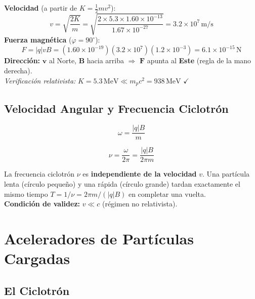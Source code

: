\documentclass[12pt, letterpaper]{report}
\numberwithin{equation}{section}
\newcommand{\vB}[1]{\boldsymbol{#1}}          %
\newcommand{\un}[1]{\,\mathrm{#1}}            %
\begin{document}
\begin{tcolorbox}[exbox,
  title=Ejemplo — Protón de $5.3\un{MeV}$ en $B=1.2\un{mT}$]
  \textbf{Velocidad} (a partir de $K=\tfrac{1}{2}mv^2$):
  \[
    v = \sqrt{\frac{2K}{m}}
      = \sqrt{\frac{2\times5.3\times1.60\times10^{-13}}{1.67\times10^{-27}}}
      = 3.2\times10^{7}\un{m/s}
  \]
  \textbf{Fuerza magnética} ($\varphi=90^\circ$):
  \[
    F = |q|vB
      = (1.60\times10^{-19})(3.2\times10^{7})(1.2\times10^{-3})
      = 6.1\times10^{-15}\un{N}
  \]
  \textbf{Dirección:} $\vB{v}$ al Norte, $\vB{B}$ hacia arriba $\Rightarrow$
  $\vB{F}$ apunta al \textbf{Este} (regla de la mano derecha).\\[4pt]
  \textit{Verificación relativista:}
  $K=5.3\un{MeV}\ll m_pc^2=938\un{MeV}$ $\checkmark$
\end{tcolorbox}

\subsection{Velocidad Angular y Frecuencia Ciclotrón}

\begin{equation}
  \boxed{\omega = \frac{|q|B}{m}}
  \label{eq:omega_ciclotron}
\end{equation}

\begin{equation}
  \boxed{\nu = \frac{\omega}{2\pi} = \frac{|q|B}{2\pi m}}
  \label{eq:nu_ciclotron}
\end{equation}

\begin{tcolorbox}[propbox, title=Isocronismo del movimiento ciclotrón]
  La frecuencia ciclotrón $\nu$ es \textbf{independiente de la velocidad}
  $v$. Una partícula lenta (círculo pequeño) y una rápida (círculo grande)
  tardan exactamente el mismo tiempo $T=1/\nu=2\pi m/(|q|B)$ en
  completar una vuelta.\\[4pt]
  \textbf{Condición de validez:} $v\ll c$ (régimen no relativista).
\end{tcolorbox}

\section{Aceleradores de Partículas Cargadas}

\subsection{El Ciclotrón}
\end{document}
